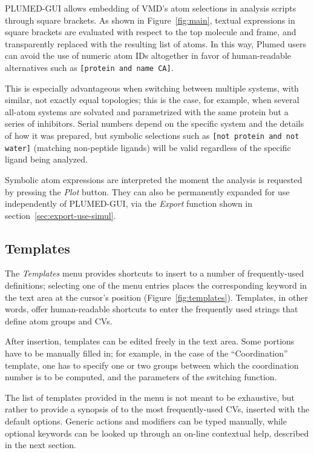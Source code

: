 \documentclass[preprint,12pt]{elsarticle}
\begin{document}
PLUMED-GUI allows  embedding of VMD's atom selections in analysis scripts
through  square brackets. As shown in Figure~\ref{fig:main},
textual expressions in square brackets are evaluated with respect to
the top molecule and frame, and transparently replaced with the
resulting list of atoms. In this way, Plumed users can 
avoid the use of numeric atom IDs altogether in favor of human-readable
alternatives such as \texttt{[protein and name CA]}.

This is especially advantageous when switching between multiple
systems, with similar, not exactly equal topologies; this is the case,
for example, when several all-atom systems are solvated and
parametrized with the same protein but a series of inhibitors.  Serial
numbers  depend on the specific system and the details of how it was prepared, but
symbolic selections such as \texttt{[not protein and not water]}
(matching non-peptide ligands) will be valid
regardless of the specific ligand being analyzed.

Symbolic atom expressions are interpreted the moment the analysis is
requested by pressing the \emph{Plot} button. They can also be
permanently expanded for use independently of PLUMED-GUI, via the
\emph{Export} function shown in section~\ref{sec:export-use-simul}.



\subsection{Templates}

The \emph{Templates} menu provides shortcuts to insert to a number of
frequently-used definitions; selecting one of the menu entries places
the corresponding keyword in the text area at the cursor's position
(Figure~\ref{fig:templates}). Templates, in other words, offer
human-readable shortcuts to enter the frequently used strings that
define atom groups and CVs.

After insertion, templates can be edited freely in the text
area.  Some portions have to be manually filled in; for example, in the
case of the ``Coordination'' template, one has to specify one or two
groups between which the coordination number is to be computed, and
the parameters of the switching function.

The list of templates provided in the menu is not meant to be
exhaustive, but rather to provide a synopsis of to the most
frequently-used CVs, inserted with the default options. Generic
actions and modifiers can be typed manually, while optional keywords
can be looked up through an on-line contextual help, described
in the next section.
\end{document}
